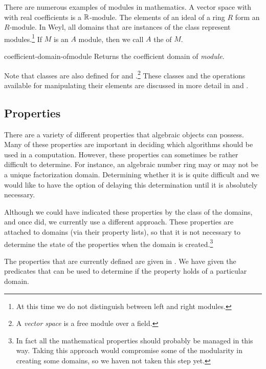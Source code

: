 There are numerous examples of modules in mathematics.  A vector space
with with real coefficients is a ${\Bbb R}$-module.  The elements of an
ideal of a ring $R$ form an $R$-module.  In Weyl, all domains that are
instances of the class  represent modules.\footnote{At
this time we do not distinguish between left and right modules.}  If
$M$ is an $A$ module, then we call $A$ the 
of $M$.

\begin{functiondef}{coefficient-domain-of}{module}
Returns the coefficient domain of {\em module}. 
\end{functiondef}

Note that classes are also defined for  and
.\footnote{A {\em vector space} is a free module
over a field.}  These classes and the operations available for
manipulating their elements are discussed in more detail in
 and .


\subsection{Properties}

There are a variety of different properties that algebraic objects can
possess.  Many of these properties are important in deciding which
algorithms should be used in a computation.  However, these properties
can sometimes be rather difficult to determine.  For instance, an
algebraic number ring may or may not be a unique factorization domain.
Determining whether it is is quite difficult and we would like to have
the option of delaying this determination until it is absolutely
necessary.

Although we could have indicated these properties by the class of the
domains, and once did, we currently use a different approach.  These
properties are attached to domains (via their property lists), so that
it is not necessary to determine the state of the properties when the
domain is created.\footnote{In fact all the mathematical properties
should probably be managed in this way.  Taking this approach would
compromise some of the modularity in creating some domains, so we
haven not taken this step yet.}

The properties that are currently defined are given in
.  We have given the predicates that can be
used to determine if the property holds of a particular domain.


